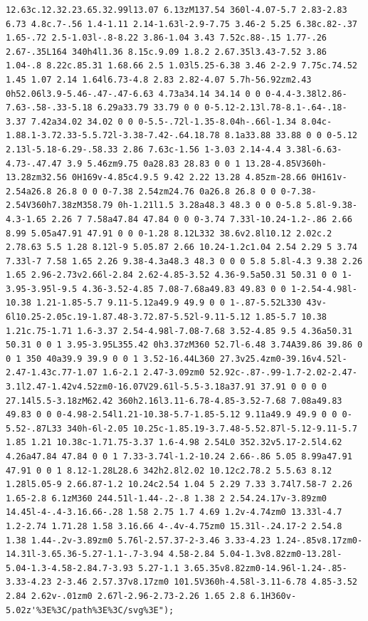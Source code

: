\documentclass[11pt]{article}
\begin{document}
\begin{enumerate}
\begin{verbatim}
12.63c.12.32.23.65.32.99l13.07 6.13zM137.54 360l-4.07-5.7 2.83-2.83 6.73 4.8c.7-.56 1.4-1.11 2.14-1.63l-2.9-7.75 3.46-2 5.25 6.38c.82-.37 1.65-.72 2.5-1.03l-.8-8.22 3.86-1.04 3.43 7.52c.88-.15 1.77-.26 2.67-.35L164 340h4l1.36 8.15c.9.09 1.8.2 2.67.35l3.43-7.52 3.86 1.04-.8 8.22c.85.31 1.68.66 2.5 1.03l5.25-6.38 3.46 2-2.9 7.75c.74.52 1.45 1.07 2.14 1.64l6.73-4.8 2.83 2.82-4.07 5.7h-56.92zm2.43 0h52.06l3.9-5.46-.47-.47-6.63 4.73a34.14 34.14 0 0 0-4.4-3.38l2.86-7.63-.58-.33-5.18 6.29a33.79 33.79 0 0 0-5.12-2.13l.78-8.1-.64-.18-3.37 7.42a34.02 34.02 0 0 0-5.5-.72l-1.35-8.04h-.66l-1.34 8.04c-1.88.1-3.72.33-5.5.72l-3.38-7.42-.64.18.78 8.1a33.88 33.88 0 0 0-5.12 2.13l-5.18-6.29-.58.33 2.86 7.63c-1.56 1-3.03 2.14-4.4 3.38l-6.63-4.73-.47.47 3.9 5.46zm9.75 0a28.83 28.83 0 0 1 13.28-4.85V360h-13.28zm32.56 0H169v-4.85c4.9.5 9.42 2.22 13.28 4.85zm-28.66 0H161v-2.54a26.8 26.8 0 0 0-7.38 2.54zm24.76 0a26.8 26.8 0 0 0-7.38-2.54V360h7.38zM358.79 0h-1.21l1.5 3.28a48.3 48.3 0 0 0-5.8 5.8l-9.38-4.3-1.65 2.26 7 7.58a47.84 47.84 0 0 0-3.74 7.33l-10.24-1.2-.86 2.66 8.99 5.05a47.91 47.91 0 0 0-1.28 8.12L332 38.6v2.8l10.12 2.02c.2 2.78.63 5.5 1.28 8.12l-9 5.05.87 2.66 10.24-1.2c1.04 2.54 2.29 5 3.74 7.33l-7 7.58 1.65 2.26 9.38-4.3a48.3 48.3 0 0 0 5.8 5.8l-4.3 9.38 2.26 1.65 2.96-2.73v2.66l-2.84 2.62-4.85-3.52 4.36-9.5a50.31 50.31 0 0 1-3.95-3.95l-9.5 4.36-3.52-4.85 7.08-7.68a49.83 49.83 0 0 1-2.54-4.98l-10.38 1.21-1.85-5.7 9.11-5.12a49.9 49.9 0 0 1-.87-5.52L330 43v-6l10.25-2.05c.19-1.87.48-3.72.87-5.52l-9.11-5.12 1.85-5.7 10.38 1.21c.75-1.71 1.6-3.37 2.54-4.98l-7.08-7.68 3.52-4.85 9.5 4.36a50.31 50.31 0 0 1 3.95-3.95L355.42 0h3.37zM360 52.7l-6.48 3.74A39.86 39.86 0 0 1 350 40a39.9 39.9 0 0 1 3.52-16.44L360 27.3v25.4zm0-39.16v4.52l-2.47-1.43c.77-1.07 1.6-2.1 2.47-3.09zm0 52.92c-.87-.99-1.7-2.02-2.47-3.1l2.47-1.42v4.52zm0-16.07V29.61l-5.5-3.18a37.91 37.91 0 0 0 0 27.14l5.5-3.18zM62.42 360h2.16l3.11-6.78-4.85-3.52-7.68 7.08a49.83 49.83 0 0 0-4.98-2.54l1.21-10.38-5.7-1.85-5.12 9.11a49.9 49.9 0 0 0-5.52-.87L33 340h-6l-2.05 10.25c-1.85.19-3.7.48-5.52.87l-5.12-9.11-5.7 1.85 1.21 10.38c-1.71.75-3.37 1.6-4.98 2.54L0 352.32v5.17-2.5l4.62 4.26a47.84 47.84 0 0 1 7.33-3.74l-1.2-10.24 2.66-.86 5.05 8.99a47.91 47.91 0 0 1 8.12-1.28L28.6 342h2.8l2.02 10.12c2.78.2 5.5.63 8.12 1.28l5.05-9 2.66.87-1.2 10.24c2.54 1.04 5 2.29 7.33 3.74l7.58-7 2.26 1.65-2.8 6.1zM360 244.51l-1.44-.2-.8 1.38 2 2.54.24.17v-3.89zm0 14.45l-4-.4-3.16.66-.28 1.58 2.75 1.7 4.69 1.2v-4.74zm0 13.33l-4.7 1.2-2.74 1.71.28 1.58 3.16.66 4-.4v-4.75zm0 15.31l-.24.17-2 2.54.8 1.38 1.44-.2v-3.89zm0 5.76l-2.57.37-2-3.46 3.33-4.23 1.24-.85v8.17zm0-14.31l-3.65.36-5.27-1.1-.7-3.94 4.58-2.84 5.04-1.3v8.82zm0-13.28l-5.04-1.3-4.58-2.84.7-3.93 5.27-1.1 3.65.35v8.82zm0-14.96l-1.24-.85-3.33-4.23 2-3.46 2.57.37v8.17zm0 101.5V360h-4.58l-3.11-6.78 4.85-3.52 2.84 2.62v-.01zm0 2.67l-2.96-2.73-2.26 1.65 2.8 6.1H360v-5.02z'%3E%3C/path%3E%3C/svg%3E");

\end{verbatim}
\end{enumerate}
\end{document}
